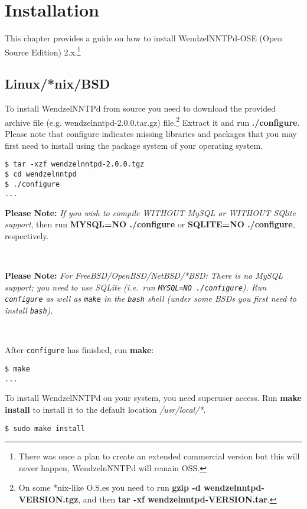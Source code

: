 \chapter{Installation}

This chapter provides a guide on how to install WendzelNNTPd-OSE (Open Source Edition) 2.x.\footnote{There was once a plan to create an extended commercial version but this will never happen, WendzelnNNTPd will remain OSS.}

\section{Linux/*nix/BSD}

To install WendzelNNTPd from source you need to download the provided archive file (e.g. wendzelnntpd-2.0.0.tar.gz) file.\footnote{On some *nix-like O.S.es you need to run {\bf gzip -d wendzelnntpd-VERSION.tgz}, and then {\bf tar -xf wendzelnntpd-VERSION.tar}.} Extract it and run {\bf ./configure}. Please note that configure indicates missing libraries and packages that you may first need to install using the package system of your operating system.

\begin{verbatim}
$ tar -xzf wendzelnntpd-2.0.0.tgz
$ cd wendzelnntpd
$ ./configure
...
\end{verbatim}

{\bf Please Note:} {\it If you wish to compile WITHOUT MySQL or WITHOUT SQlite support}, then run {\bf MYSQL=NO ./configure} or {\bf SQLITE=NO ./configure}, respectively.

~

{\bf Please Note:} {\it For FreeBSD/OpenBSD/NetBSD/*BSD: There is no MySQL support; you need to use SQLite (i.e.\ run \texttt{MYSQL=NO ./configure}). Run \texttt{configure} as well as \texttt{make} in the \texttt{bash} shell (under some BSDs you first need to install \texttt{bash}).}

~

After \texttt{configure} has finished, run {\bf make}:

\begin{verbatim}
$ make
...
\end{verbatim}

To install WendzelNNTPd on your system, you need superuser access. Run {\bf make install} to install it to the default location {\it /usr/local/*}.

\begin{verbatim}
$ sudo make install
\end{verbatim}

